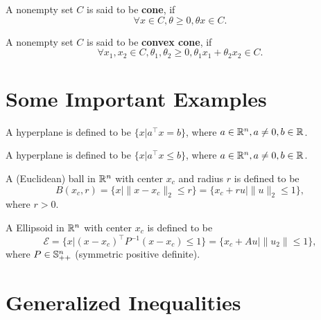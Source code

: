 \begin{definition}[Cone]
	A nonempty set \(C\) is said to be \textbf{cone}, if
	\begin{equation*}
		\forall x\in C,\theta\geq 0,\theta x\in C.
	\end{equation*}
\end{definition}

\begin{definition}
	A nonempty set \(C\) is said to be \textbf{convex cone}, if
	\begin{equation*}
		\forall x_1,x_2\in C, \theta_1,\theta_2\geq 0,\theta_1 x_1+\theta_2 x_2\in C.
	\end{equation*}
\end{definition}

\section{Some Important Examples}

\begin{definition}[Hyperplane]
	A hyperplane is defined to be \(\{x|a^{\top}x=b\}\), where \(a\in\mathbb{R}^n,a\neq 0,b\in\mathbb{R}\).
\end{definition}

\begin{definition}[Halfspace]
	A hyperplane is defined to be \(\{x|a^{\top}x\leq b\}\), where \(a\in\mathbb{R}^n,a\neq 0,b\in\mathbb{R}\).
\end{definition}

\begin{definition}
	A (Euclidean) ball in \(\mathbb{R}^n\) with center \(x_c\) and radius \(r\) is defined to be
	\begin{equation*}
		B(x_c,r)=\{x\vert\|x-x_c\|_2\leq r\}=\{x_c+ru\vert\|u\|_2\leq 1\},
	\end{equation*}
	where \(r>0\).
\end{definition}

\begin{definition}[Ellipsoid]
	A Ellipsoid in \(\mathbb{R}^n\) with center \(x_c\) is defined to be
	\begin{equation*}
		\mathcal{E}=\{x\vert(x-x_c)^{\top}P^{-1}(x-x_c)\leq 1\}=\{x_c+Au\vert \|u_2\|\leq 1\},
	\end{equation*}
	where \(P\in\mathbb{S}^{n}_{++}\) (symmetric positive definite).
\end{definition}

\section{Generalized Inequalities}

